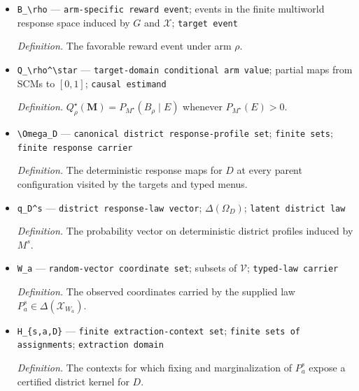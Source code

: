 \documentclass{article}
\begin{document}
\begin{itemize}
  \par\smallskip\noindent\emph{Definition.} \texttt{The evidence event shared by the arm values under comparison.}
  \item \texttt{B\_\allowbreak{}\textbackslash{}\allowbreak{}rho} --- \texttt{arm-\allowbreak{}specific reward event}; events in the finite multiworld response space induced by \(G\) and \(\mathcal X\); \texttt{target event}
  \par\smallskip\noindent\emph{Definition.} The favorable reward event under arm \(\rho\).
  \item \texttt{Q\_\allowbreak{}\textbackslash{}\allowbreak{}rho\textasciicircum{}\textbackslash{}\allowbreak{}star} --- \texttt{target-\allowbreak{}domain conditional arm value}; partial maps from SCMs to \([0,1]\); \texttt{causal estimand}
  \par\smallskip\noindent\emph{Definition.} \(Q_\rho^\star(\mathbf M)=P_{M^\star}(B_\rho\mid E)\) whenever \(P_{M^\star}(E)>0\).
  \item \texttt{\textbackslash{}\allowbreak{}Omega\_\allowbreak{}D} --- \texttt{canonical district response-\allowbreak{}profile set}; \texttt{finite sets}; \texttt{finite response carrier}
  \par\smallskip\noindent\emph{Definition.} The deterministic response maps for \(D\) at every parent configuration visited by the targets and typed menus.
  \item \texttt{q\_\allowbreak{}D\textasciicircum{}s} --- \texttt{district response-\allowbreak{}law vector}; \(\Delta(\Omega_D)\); \texttt{latent district law}
  \par\smallskip\noindent\emph{Definition.} The probability vector on deterministic district profiles induced by \(M^s\).
  \item \texttt{W\_\allowbreak{}a} --- \texttt{random-\allowbreak{}vector coordinate set}; subsets of \(\mathcal V\); \texttt{typed-\allowbreak{}law carrier}
  \par\smallskip\noindent\emph{Definition.} The observed coordinates carried by the supplied law \(P_a^s\in\Delta(\mathcal X_{W_a})\).
  \item \texttt{H\_\allowbreak{}\{s,\allowbreak{}a,\allowbreak{}D\}\allowbreak{}} --- \texttt{finite extraction-\allowbreak{}context set}; \texttt{finite sets of assignments}; \texttt{extraction domain}
  \par\smallskip\noindent\emph{Definition.} The contexts for which fixing and marginalization of \(P_a^s\) expose a certified district kernel for \(D\).

\end{itemize}
\end{document}
